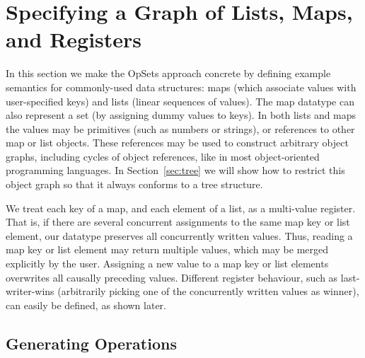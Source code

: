 \section{Specifying a Graph of Lists, Maps, and Registers}\label{sec:datatypes}

In this section we make the OpSets approach concrete by defining example semantics for commonly-used data structures: maps (which associate values with user-specified keys) and lists (linear sequences of values).
The map datatype can also represent a set (by assigning dummy values to keys).
In both lists and maps the values may be primitives (such as numbers or strings), or references to other map or list objects.
These references may be used to construct arbitrary object graphs, including cycles of object references, like in most object-oriented programming languages.
In Section~\ref{sec:tree} we will show how to restrict this object graph so that it always conforms to a tree structure.

We treat each key of a map, and each element of a list, as a multi-value register.
That is, if there are several concurrent assignments to the same map key or list element, our datatype preserves all concurrently written values.
Thus, reading a map key or list element may return multiple values, which may be merged explicitly by the user.
Assigning a new value to a map key or list elements overwrites all causally preceding values.
Different register behaviour, such as last-writer-wins (arbitrarily picking one of the concurrently written values as winner), can easily be defined, as shown later.

\subsection{Generating Operations}\label{sec:datatypes-gen}


